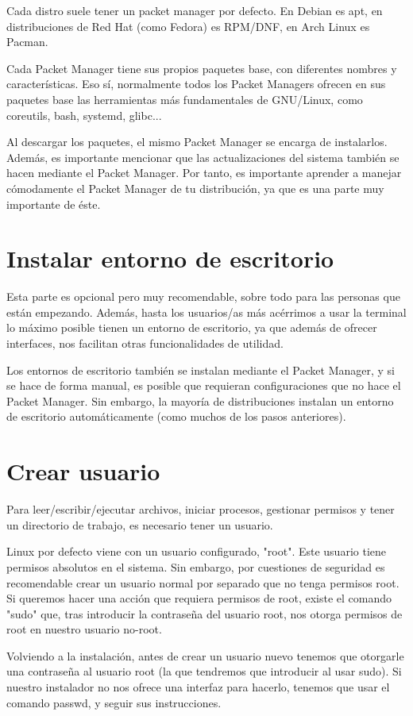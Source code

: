 Cada distro suele tener un packet manager por defecto. En Debian es apt, en distribuciones de Red Hat (como Fedora) es RPM/DNF, en Arch Linux es Pacman.

Cada Packet Manager tiene sus propios paquetes base, con diferentes nombres y características. Eso sí, normalmente todos los Packet Managers ofrecen en sus paquetes base las herramientas más fundamentales de GNU/Linux, como coreutils, bash, systemd, glibc...

Al descargar los paquetes, el mismo Packet Manager se encarga de instalarlos. Además, es importante mencionar que las actualizaciones del sistema también se hacen mediante el Packet Manager. Por tanto, es importante aprender a manejar cómodamente el Packet Manager de tu distribución, ya que es una parte muy importante de éste.

\section{Instalar entorno de escritorio}
Esta parte es opcional pero muy recomendable, sobre todo para las personas que están empezando. Además, hasta los usuarios/as más acérrimos a usar la terminal lo máximo posible tienen un entorno de escritorio, ya que además de ofrecer interfaces, nos facilitan otras funcionalidades de utilidad.

Los entornos de escritorio también se instalan mediante el Packet Manager, y si se hace de forma manual, es posible que requieran configuraciones que no hace el Packet Manager. Sin embargo, la mayoría de distribuciones instalan un entorno de escritorio automáticamente (como muchos de los pasos anteriores).

\section{Crear usuario}
Para leer/escribir/ejecutar archivos, iniciar procesos, gestionar permisos y tener un directorio de trabajo, es necesario tener un usuario.

Linux por defecto viene con un usuario configurado, "root". Este usuario tiene permisos absolutos en el sistema. Sin embargo, por cuestiones de seguridad es recomendable crear un usuario normal por separado que no tenga permisos root. Si queremos hacer una acción que requiera permisos de root, existe el comando "sudo" que, tras introducir la contraseña del usuario root, nos otorga permisos de root en nuestro usuario no-root.

Volviendo a la instalación, antes de crear un usuario nuevo tenemos que otorgarle una contraseña al usuario root (la que tendremos que introducir al usar sudo). Si nuestro instalador no nos ofrece una interfaz para hacerlo, tenemos que usar el comando passwd, y seguir sus instrucciones.

